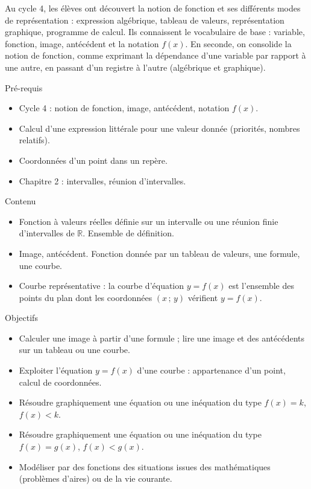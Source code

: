 \documentclass{article}
\theoremstyle{definition}
\begin{document}
\pagestyle{fancy}

\fancyhf{} %
\fancyhead[L]{\large \textbf{\Niveau}}
\fancyhead[C]{\large \textbf{\Chapitre}}

\large

Au cycle 4, les élèves ont découvert la notion de fonction et ses différents modes de représentation : expression algébrique, tableau de valeurs, représentation graphique, programme de calcul. Ils connaissent le vocabulaire de base : variable, fonction, image, antécédent et la notation $f(x)$. En seconde, on consolide la notion de fonction, comme exprimant la dépendance d'une variable par rapport à une autre, en passant d'un registre à l'autre (algébrique et graphique).

\begin{paragraph}{Pré-requis}
  \begin{itemize}
    \item Cycle 4 : notion de fonction, image, antécédent, notation $f(x)$.
    \item Calcul d'une expression littérale pour une valeur donnée (priorités, nombres relatifs).
    \item Coordonnées d'un point dans un repère.
    \item Chapitre 2 : intervalles, réunion d'intervalles.
  \end{itemize}
\end{paragraph}

\begin{paragraph}{Contenu}
    \begin{itemize}
        \item Fonction à valeurs réelles définie sur un intervalle ou une réunion finie d'intervalles de $\mathbb{R}$. Ensemble de définition.
        \item Image, antécédent. Fonction donnée par un tableau de valeurs, une formule, une courbe.
        \item Courbe représentative : la courbe d'équation $y = f(x)$ est l'ensemble des points du plan dont les coordonnées $(x\,;\,y)$ vérifient $y = f(x)$.
    \end{itemize}
\end{paragraph}

\begin{paragraph}{Objectifs}
  \begin{itemize}
    \item Calculer une image à partir d'une formule ; lire une image et des antécédents sur un tableau ou une courbe.
    \item Exploiter l'équation $y = f(x)$ d'une courbe : appartenance d'un point, calcul de coordonnées.
    \item Résoudre graphiquement une équation ou une inéquation du type $f(x) = k$, $f(x) < k$.
    \item Résoudre graphiquement une équation ou une inéquation du type $f(x) = g(x)$, $f(x) < g(x)$.
    \item Modéliser par des fonctions des situations issues des mathématiques (problèmes d'aires) ou de la vie courante.
  \end{itemize}
\end{paragraph}
\end{document}
